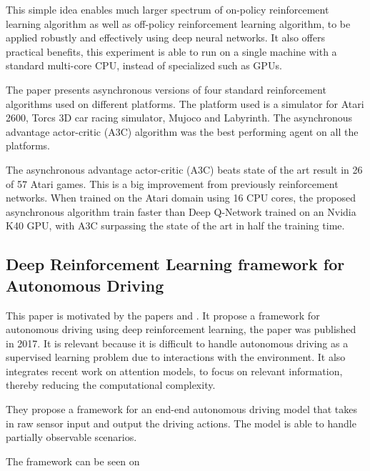 This simple idea enables much larger spectrum of on-policy reinforcement learning algorithm as well as off-policy reinforcement learning algorithm, to be applied robustly and effectively using deep neural networks.  It also offers practical benefits, this experiment is able to run on a single machine with a standard multi-core CPU, instead of specialized such as GPUs.

The paper presents asynchronous versions of four standard reinforcement algorithms used on different platforms. The platform used is a simulator for Atari 2600, Torcs 3D car racing simulator, Mujoco and Labyrinth. The asynchronous advantage actor-critic (A3C) algorithm was the best performing agent on all the platforms.

The asynchronous advantage actor-critic (A3C) beats state of the art result in 26 of 57 Atari games. This is a big improvement from previously reinforcement networks. When trained on the Atari domain using 16 CPU cores, the proposed asynchronous algorithm train faster than Deep Q-Network trained on an Nvidia K40 GPU, with A3C surpassing the state of the art in half the training time.   

\subsection{Deep Reinforcement Learning framework for Autonomous Driving} \cite{Sallab:2017:2470-1173:70}
This paper is motivated by the papers \cite{DBLP:journals/corr/MnihKSGAWR13} and \cite{Silver_2016}. It propose a framework for autonomous driving using deep reinforcement learning, the paper was published in 2017. It is relevant because it is difficult to handle autonomous driving as a supervised learning problem due to interactions with the environment. It also integrates recent work on attention models, to focus on relevant information, thereby reducing the computational complexity.

They propose a framework for an end-end autonomous driving model that takes in raw sensor input and output the driving actions. The model is able to handle partially observable scenarios. 

The framework can be seen on  

